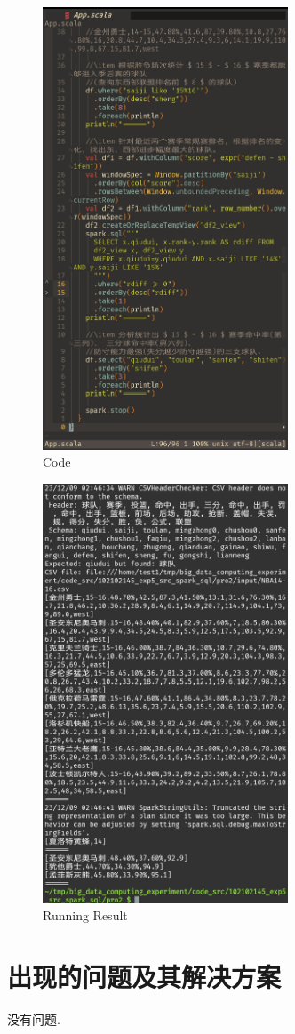 \documentclass{article}
\begin{document}
\begin{figure}[H]
  \begin{center}
    \includegraphics[width=0.65\textwidth]{./figures/6.jpg}
  \end{center}
  \caption{Code}
\end{figure}

\begin{figure}[H]
  \begin{center}
    \includegraphics[width=0.65\textwidth]{./figures/7.jpg}
  \end{center}
  \caption{Running Result}
\end{figure}

\section{出现的问题及其解决方案}
没有问题.
\end{document}
